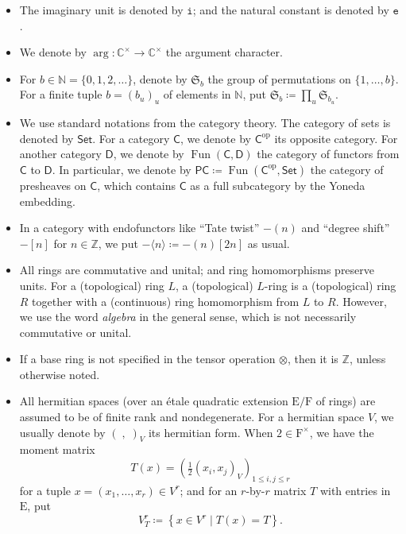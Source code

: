 \documentclass[12pt]{amsart}
\numberwithin{equation}{section}
\theoremstyle{plain}
\theoremstyle{definition}
\theoremstyle{remark}
\renewcommand{\d}[1]{\mathbb{#1}}
\newcommand{\f}[1]{\mathfrak{#1}}
\renewcommand{\r}[1]{\mathrm{#1}}
\renewcommand{\sf}[1]{\mathsf{#1}}
\renewcommand{\(}{\left(}
\renewcommand{\)}{\right)}
\newcommand{\res}{\mathbin{|}}
\newcommand{\ang}[1]{\langle{#1}\rangle}
\renewcommand{\leq}{\leqslant}
\newcommand{\dC}{\d C}
\newcommand{\dN}{\d N}
\newcommand{\dZ}{\d Z}
\newcommand{\fS}{\f S}
\newcommand{\rE}{\r E}
\newcommand{\rF}{\r F}
\newcommand{\sfC}{\sf C}
\newcommand{\sfD}{\sf D}
\newcommand{\sfP}{\sf P}
\newcommand{\te}{\mathtt{e}}
\newcommand{\ti}{\mathtt{i}}
\newcommand{\op}{\r{op}}
\newcommand{\Set}{\sf{Set}}
\DeclareMathOperator{\Fun}{Fun}
\begin{document}
\begin{itemize}
  \item The imaginary unit is denoted by $\ti$; and the natural constant is denoted by $\te$.

  \item We denote by $\arg\colon\dC^\times\to\dC^\times$ the argument character.

  \item For $b\in\dN=\{0,1,2,\dots\}$, denote by $\fS_b$ the group of permutations on $\{1,\dots,b\}$. For a finite tuple $b=(b_u)_u$ of elements in $\dN$, put $\fS_b\coloneqq\prod_u\fS_{b_u}$.

  \item We use standard notations from the category theory. The category of sets is denoted by $\Set$. For a category $\sfC$, we denote by $\sfC^\op$ its opposite category. For another category $\sfD$, we denote by $\Fun(\sfC,\sfD)$ the category of functors from $\sfC$ to $\sfD$. In particular, we denote by $\sfP\sfC\coloneqq\Fun(\sfC^\op,\Set)$ the category of presheaves on $\sfC$, which contains $\sfC$ as a full subcategory by the Yoneda embedding.

  \item In a category with endofunctors like ``Tate twist'' $-(n)$ and ``degree shift'' $-[n]$ for $n\in\dZ$, we put $-\ang{n}\coloneqq-(n)[2n]$ as usual.

  \item All rings are commutative and unital; and ring homomorphisms preserve units. For a (topological) ring $L$, a (topological) $L$-ring is a (topological) ring $R$ together with a (continuous) ring homomorphism from $L$ to $R$. However, we use the word \emph{algebra} in the general sense, which is not necessarily commutative or unital.

  \item If a base ring is not specified in the tensor operation $\otimes$, then it is $\dZ$, unless otherwise noted.

  \item All hermitian spaces (over an \'{e}tale quadratic extension $\rE/\rF$ of rings) are assumed to be of finite rank and nondegenerate. For a hermitian space $V$, we usually denote by $(\;,\;)_V$ its hermitian form. When $2\in\rF^\times$, we have the moment matrix
      \[
      T(x)=\(\tfrac{1}{2}(x_i,x_j)_V\)_{1\leq i,j\leq r}
      \]
      for a tuple $x=(x_1,\dots,x_r)\in V^r$; and for an $r$-by-$r$ matrix $T$ with entries in $\rE$, put
      \[
      V^r_T\coloneqq\left\{x\in V^r\res T(x)=T\right\}.
      \]
\end{itemize}
\end{document}

